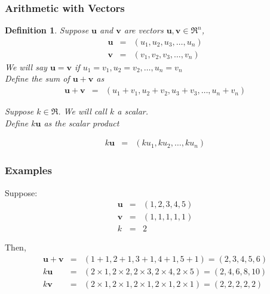 \documentclass{beamer}
\newtheorem{defn}{Definition}
\numberwithin{equation}{section}
\begin{document}
\begin{frame}
\frametitle{Arithmetic with Vectors} 

\begin{defn} Suppose $\boldsymbol{u}$ and $\boldsymbol{v}$ are vectors $ \boldsymbol{u}, \boldsymbol{v} \in \Re^{n}$, \\

\begin{eqnarray}
\boldsymbol{u} & = & (u_{1}, u_{2}, u_{3}, \hdots, u_{n} ) \nonumber \\
\boldsymbol{v} & = & (v_{1}, v_{2}, v_{3}, \hdots, v_{n} ) \nonumber 
\end{eqnarray}
We will say $\boldsymbol{u} = \boldsymbol{v}$ if $u_{1} = v_{1}, u_{2} = v_{2}, \hdots, u_{n} = v_{n} $\\




Define the \alert{sum} of $\boldsymbol{u} + \boldsymbol{v}$ as 
\begin{eqnarray}
\boldsymbol{u} + \boldsymbol{v} & = & (u_{1} + v_{1}, u_{2} + v_{2}, u_{3} + v_{3}, \hdots, u_{n} + v_{n} ) \nonumber 
\end{eqnarray}

Suppose $k \in \Re$.  We will call $k$ a \alert{scalar}.\\

Define $k \boldsymbol{u}$ as the \alert{scalar product} 

\begin{eqnarray}
k \boldsymbol{u} & = & (k u_{1}, k u_{2}, \hdots, k u_{n} ) \nonumber 
\end{eqnarray}

\end{defn}

\end{frame}

\begin{frame}
\frametitle{Examples} 

Suppose:
\begin{eqnarray}
\boldsymbol{u} & = & (1, 2, 3, 4, 5) \nonumber \\
\boldsymbol{v} & = & (1, 1, 1, 1, 1) \nonumber \\
k & = & 2 \nonumber 
\end{eqnarray}

Then, 
\begin{eqnarray}
\boldsymbol{u}  + \boldsymbol{v} & = & (1 + 1, 2 + 1, 3+ 1, 4 + 1, 5+ 1)  = (2, 3, 4, 5, 6)\nonumber \\
k \boldsymbol{u} & = & (2 \times 1, 2 \times 2, 2 \times 3, 2 \times 4, 2 \times 5) = (2, 4, 6, 8, 10) \nonumber \\
k \boldsymbol{v} & = & (2 \times 1,2 \times 1,2 \times 1,2 \times 1,2 \times 1) = (2, 2, 2, 2, 2) \nonumber 
\end{eqnarray}

\end{frame}
\end{document}
